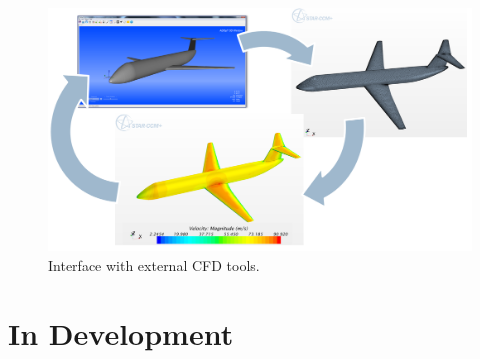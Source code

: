 \begin{figure}[H]
	\centering
		\includegraphics[width=12 cm]{Immagini/interface}
		\caption{Interface with external CFD tools.}
		\label{fig:badTail}
	\end{figure}
	
\section{In Development}